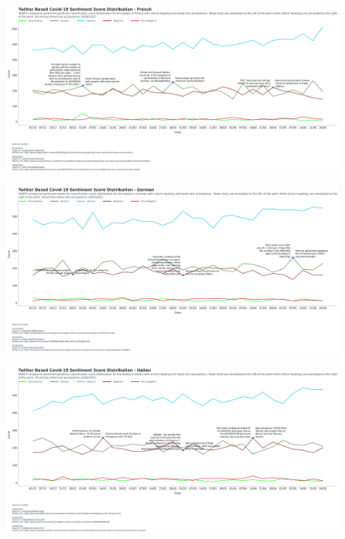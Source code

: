 \begin{landscape}
\begin{figure}[h!]
\includegraphics[scale=0.33]{Final French Annotated Distribution.png}
\caption[Final French Annotated Distribution]{ }
\label{fig:French}
\end{figure}

\begin{figure}[h!]
\includegraphics[scale=0.33]{Final German Annotated Distribution.png}
\caption[Final German Annotated Distribution]{ }
\label{fig:German}
\end{figure}

\begin{figure}[h!]
\includegraphics[scale=0.33]{Final Italian Annotated Distribution.png}
\caption[Final Italian Annotated Distribution]{ }
\label{fig:Italian}
\end{figure}


\end{landscape}
